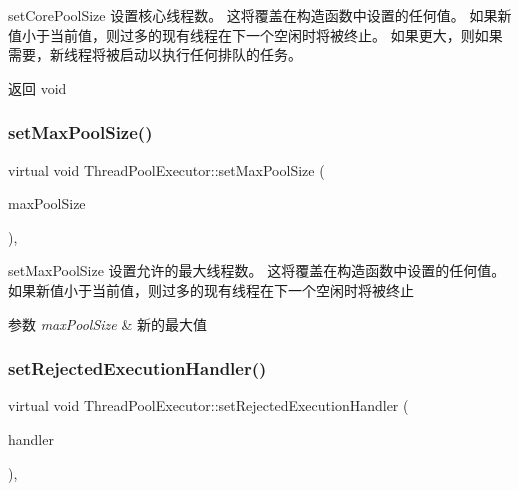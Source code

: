 set\+Core\+Pool\+Size 设置核心线程数。 这将覆盖在构造函数中设置的任何值。 如果新值小于当前值，则过多的现有线程在下一个空闲时将被终止。 如果更大，则如果需要，新线程将被启动以执行任何排队的任务。 

\begin{DoxyReturn}{返回}
void 
\end{DoxyReturn}
\mbox{\label{classThreadPoolExecutor_ac5a10d336958ca43530b31bff81c9c4b}} 
\subsubsection{\texorpdfstring{set\+Max\+Pool\+Size()}{setMaxPoolSize()}}
{\footnotesize\ttfamily virtual void Thread\+Pool\+Executor\+::set\+Max\+Pool\+Size (\begin{DoxyParamCaption}\item[{int}]{max\+Pool\+Size }\end{DoxyParamCaption})\hspace{0.3cm}{\ttfamily [final]}, {\ttfamily [virtual]}}



set\+Max\+Pool\+Size 设置允许的最大线程数。 这将覆盖在构造函数中设置的任何值。 如果新值小于当前值，则过多的现有线程在下一个空闲时将被终止 


\begin{DoxyParams}{参数}
{\em max\+Pool\+Size} & 新的最大值 \\
\hline
\end{DoxyParams}
\mbox{\label{classThreadPoolExecutor_a0a471dc0a68b70d99d8215565a4df688}} 
\subsubsection{\texorpdfstring{set\+Rejected\+Execution\+Handler()}{setRejectedExecutionHandler()}}
{\footnotesize\ttfamily virtual void Thread\+Pool\+Executor\+::set\+Rejected\+Execution\+Handler (\begin{DoxyParamCaption}\item[{\hyperlink{classRejectedExecutionHandler}{Rejected\+Execution\+Handler}}]{handler }\end{DoxyParamCaption})\hspace{0.3cm}{\ttfamily [final]}, {\ttfamily [virtual]}}




